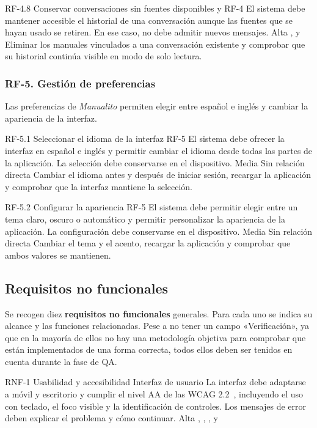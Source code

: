 \requisitoFuncional
{RF-4.8}
{Conservar conversaciones sin fuentes disponibles}
{ y }
{RF-4}
{El sistema debe mantener accesible el historial de una conversación aunque las fuentes que se hayan usado se retiren. En ese caso, no
debe admitir nuevos mensajes.}
{Alta}
{,  y }
{Eliminar los manuales vinculados a una conversación existente y comprobar que
su historial continúa visible en modo de solo lectura.}

\subsubsection{RF-5. Gestión de preferencias}

Las preferencias de \textit{Manualito} permiten elegir entre español e
inglés y cambiar la apariencia de la interfaz.


\requisitoFuncional
{RF-5.1}
{Seleccionar el idioma de la interfaz}
{}
{RF-5}
{El sistema debe ofrecer la interfaz en español e inglés y permitir cambiar el
idioma desde todas las partes de la aplicación. La selección debe
conservarse en el dispositivo.}
{Media}
{Sin relación directa}
{Cambiar el idioma antes y después de iniciar sesión, recargar la aplicación y
comprobar que la interfaz mantiene la selección.}

\requisitoFuncional
{RF-5.2}
{Configurar la apariencia}
{}
{RF-5}
{El sistema debe permitir elegir entre un tema claro, oscuro o automático y
permitir personalizar la apariencia de la aplicación. La configuración debe conservarse en el
dispositivo.}
{Media}
{Sin relación directa}
{Cambiar el tema y el acento, recargar la aplicación y comprobar que ambos
valores se mantienen.}


\subsection{Requisitos no funcionales}

Se recogen diez \textbf{requisitos no funcionales} generales. Para cada uno
se indica su alcance y las funciones relacionadas. Pese a no tener un campo
«Verificación», ya que en la mayoría de ellos no hay una metodología objetiva
para comprobar que están implementados de una forma correcta, todos ellos deben ser tenidos en cuenta durante la fase de \ac{QA}.

\requisitoNoFuncional
{RNF-1}
{Usabilidad y accesibilidad}
{}
{Interfaz de usuario}
{La interfaz debe adaptarse a móvil y escritorio y cumplir el nivel AA de las
\ac{WCAG} 2.2~\cite{w3c_wcag_22}, incluyendo el uso con teclado, el foco visible
y la identificación de controles.
Los mensajes de error deben explicar el problema y cómo continuar.}
{Alta}
{, , ,  y
}


